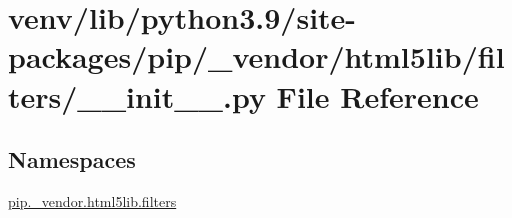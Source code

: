 \hypertarget{venv_2lib_2python3_89_2site-packages_2pip_2__vendor_2html5lib_2filters_2____init_____8py}{}\section{venv/lib/python3.9/site-\/packages/pip/\+\_\+vendor/html5lib/filters/\+\_\+\+\_\+init\+\_\+\+\_\+.py File Reference}
\label{venv_2lib_2python3_89_2site-packages_2pip_2__vendor_2html5lib_2filters_2____init_____8py}
\subsection*{Namespaces}
\begin{DoxyCompactItemize}
\item 
 \hyperlink{namespacepip_1_1__vendor_1_1html5lib_1_1filters}{pip.\+\_\+vendor.\+html5lib.\+filters}
\end{DoxyCompactItemize}
